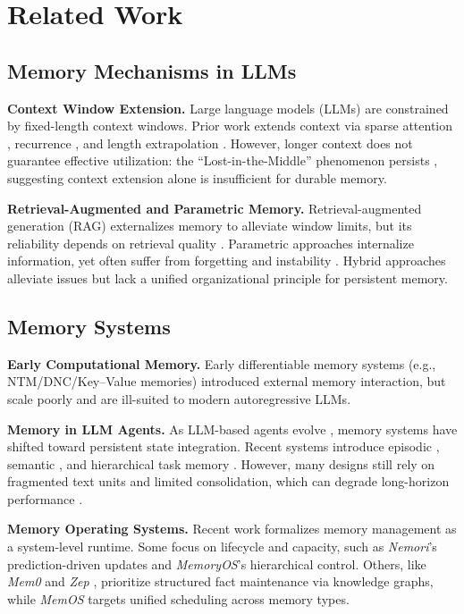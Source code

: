 \section{Related Work}

\subsection{Memory Mechanisms in LLMs}

\textbf{Context Window Extension.} Large language models (LLMs) are constrained by fixed-length context windows. Prior work extends context via sparse attention \cite{beltagy2020longformer,zaheer2020bigbird}, recurrence \cite{dai2019transformer,bulatov2022recurrent}, and length extrapolation \cite{chen2024clex,chen2025longpo}. However, longer context does not guarantee effective utilization: the ``Lost-in-the-Middle'' phenomenon persists \cite{liu2024lost, Bulatov2023ScalingTT}, suggesting context extension alone is insufficient for durable memory.


\textbf{Retrieval-Augmented and Parametric Memory.} Retrieval-augmented generation (RAG) \cite{lewis2020retrieval} externalizes memory to alleviate window limits, but its reliability depends on retrieval quality \cite{ram2023incontext}. Parametric approaches internalize information, yet often suffer from forgetting and instability \cite{delange2022continual}. Hybrid approaches \cite{wang2023longmem,packer2024memgpt} alleviate issues but lack a unified organizational principle for persistent memory.

\subsection{Memory Systems}
\textbf{Early Computational Memory.} Early differentiable memory systems (e.g., NTM/DNC/Key--Value memories) \cite{graves2014ntm,graves2016dnc,miller2016kv} introduced external memory interaction, but scale poorly and are ill-suited to modern autoregressive LLMs.

\textbf{Memory in LLM Agents.} As LLM-based agents evolve \cite{xi2023rise, xia2024agent}, memory systems have shifted toward persistent state integration. Recent systems introduce episodic \cite{wang2025mirix}, semantic \cite{shinn2024reflexion}, and hierarchical task memory \cite{sun2025hierarchical}. However, many designs still rely on fragmented text units and limited consolidation, which can degrade long-horizon performance \cite{packer2024memgpt}.

\textbf{Memory Operating Systems.} Recent work formalizes memory management as a system-level runtime. Some focus on lifecycle and capacity, such as \textit{Nemori}'s \cite{nemori2025} prediction-driven updates and \textit{MemoryOS}'s \cite{kang2025memory} hierarchical control. Others, like \textit{Mem0} \cite{mem02025} and \textit{Zep} \cite{zep2025}, prioritize structured fact maintenance via knowledge graphs, while \textit{MemOS} \cite{li2025memos} targets unified scheduling across memory types.

